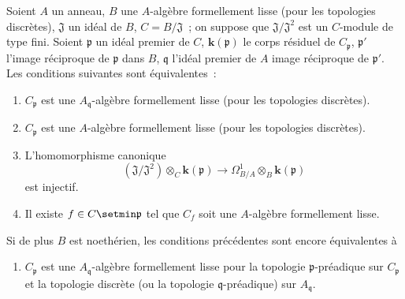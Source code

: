 \begin{proposition}[22.6.4]
\label{0.22.6.4-fr}
Soient $A$ un anneau, $B$ une $A$-algèbre formellement lisse (pour les
topologies discrètes), $\mathfrak J$ un idéal de $B$, $C=B/\mathfrak J$~; on
suppose que $\mathfrak J/\mathfrak J^2$ est un $C$-module de type fini. Soient
$\mathfrak p$ un idéal premier de $C$, $\boldsymbol{k}(\mathfrak p)$ le corps résiduel de
$C_{\mathfrak p}$, $\mathfrak p'$ l'image réciproque de $\mathfrak p$ dans
$B$, $\mathfrak q$ l'idéal premier de $A$ image réciproque de $\mathfrak p'$.
Les conditions suivantes sont équivalentes~:
\begin{enumerate}
  \item[\textup{a)}] $C_{\mathfrak p}$ est une $A_{\mathfrak q}$-algèbre formellement
  lisse (pour les topologies discrètes).
  \item[\textup{a')}] $C_{\mathfrak p}$ est une $A$-algèbre formellement lisse (pour
  les topologies discrètes).
  \item[\textup{b)}] L'homomorphisme canonique
  \begin{equation}
  \label{0.22.6.4.1-fr}
    (\mathfrak J/\mathfrak J^2)\otimes_C\boldsymbol{k}(\mathfrak p)
    \longrightarrow\Omega^1_{B/A}\otimes_B\boldsymbol{k}(\mathfrak p)
    \tag{22.6.4.1}
  \end{equation}
  est injectif.
  \item[\textup{c)}] Il existe $f\in C\setmin\mathfrak p$ tel que $C_f$ soit une
  $A$-algèbre formellement lisse.
\end{enumerate}
Si de plus $B$ est noethérien, les conditions précédentes sont encore
équivalentes à
\begin{enumerate}
  \item[\textup{d)}] $C_{\mathfrak p}$ est une $A_{\mathfrak q}$-algèbre formellement
  lisse pour la topologie $\mathfrak p$-préadique sur $C_{\mathfrak p}$ et la
  topologie discrète (ou la topologie $\mathfrak q$-préadique) sur
  $A_{\mathfrak q}$.
\end{enumerate}
\end{proposition}

